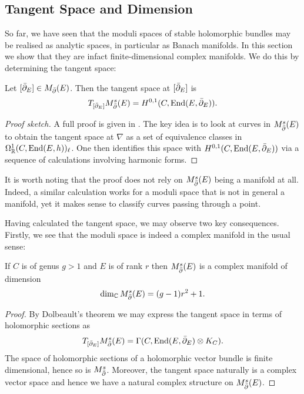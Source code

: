 \documentclass[12pt]{ociamthesis}  %
\begin{document}
\subsection{Tangent Space and Dimension}

So far, we have seen that the moduli spaces of stable holomorphic
bundles may be realised as analytic spaces, in particular as
Banach manifolds. In this section we show that they are infact
finite-dimensional complex manifolds. We do this by determining
the tangent space:

\begin{theorem}
  Let $[{\bar{\partial}}_E]\in M_{\bar{\partial}}(E)$. Then the tangent space at $[{\bar{\partial}}_E]$ is
  \begin{align*}
    T_{[{\bar{\partial}}_E]}M^s_{\bar{\partial}}(E) = H^{0,1}(C,\operatorname{End}(E,{\bar{\partial}}_E)).
  \end{align*}
  \begin{proof}[Proof sketch]
    A full proof is given in \cite[223-225]{kobayashi1987}. The key idea is to look
    at curves in $M^s_{\bar{\partial}}(E)$ to obtain the tangent space at $\nabla$ as a set of
    equivalence classes in $\Omega^1_{\mathbb{R}}(C,\operatorname{End}(E,h))_\ell$. One then
    identifies this space with $H^{0,1}(C,\operatorname{End}(E,{\bar{\partial}}_E))$ via a sequence of calculations
    involving harmonic forms.
  \end{proof}
\end{theorem}

It is worth noting that the proof does not rely on $M^s_{\bar{\partial}}(E)$ being a manifold
at all. Indeed, a similar calculation works for a moduli space that is not
in general a manifold, yet it makes sense to classify curves passing through a point.

Having calculated the tangent space, we may observe two key consequences.
Firstly, we see that the moduli space is indeed a complex manifold in the usual sense:

\begin{corollary}
  If $C$ is of genus $g>1$ and $E$ is of rank $r$ then
  $M^s_{\bar{\partial}}(E)$ is a complex manifold of dimension
  \begin{align*}
    \dim_{\mathbb{C}} M^s_{\bar{\partial}}(E) = (g-1)r^2 + 1.
  \end{align*}
  \begin{proof}
    By Dolbeault's theorem we may express the tangent space in terms of holomorphic
    sections as
    \begin{align*}
      T_{[{\bar{\partial}}_E]}M^s_{\bar{\partial}}(E) = \Gamma(C,\operatorname{End}(E,{\bar{\partial}}_E) \otimes K_C).
    \end{align*}
    The space of holomorphic sections of a holomorphic vector bundle is finite dimensional,
    hence so is $M^s_{\bar{\partial}}$. Moreover, the tangent space naturally is a complex vector
    space and hence we have a natural complex structure on $M^s_{\bar{\partial}}(E)$.

  \end{proof}
\end{corollary}
\end{document}
